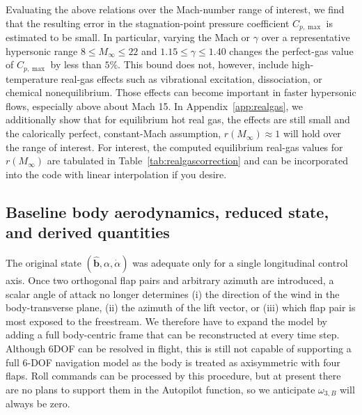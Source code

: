 Evaluating the above relations over the Mach-number range of interest, we find that the resulting error in the stagnation-point pressure coefficient \(C_{p,\max}\) is estimated to be small. In particular, varying the Mach or \(\gamma\) over a representative hypersonic range \(8 \le M_\infty \le 22\) and \(1.15 \le \gamma \le 1.40\) changes the perfect-gas value of \(C_{p,\max}\) by less than \(5\%\). This bound does not, however, include high-temperature real-gas effects such as vibrational excitation, dissociation, or chemical nonequilibrium. Those effects can become important in faster hypersonic flows, especially above about Mach 15. In Appendix~\ref{app:realgas}, we additionally show that for equilibrium hot real gas, the effects are still small and the calorically perfect, constant-Mach assumption, \(r(M_\infty)\approx1\) will hold over the range of interest. For interest, the computed equilibrium real-gas values for \(r(M_\infty)\) are tabulated in Table~\ref{tab:realgascorrection} and can be incorporated into the code with linear interpolation if you desire.

\subsection{Baseline body aerodynamics, reduced state, and derived quantities}\label{sec:baselineaero}

The original state \((\hat{\mathbf b},\alpha,\dot{\alpha})\) was adequate only for a single longitudinal control axis. Once two orthogonal flap pairs and arbitrary azimuth are introduced, a scalar angle of attack no longer determines (i) the direction of the wind in the body-transverse plane, (ii) the azimuth of the lift vector, or (iii) which flap pair is most exposed to the freestream. We therefore have to expand the model by adding a full body-centric frame that can be reconstructed at every time step. Although 6DOF can be resolved in flight, this is still not capable of supporting a full 6-DOF navigation model as the body is treated as axisymmetric with four flaps. Roll commands can be processed by this procedure, but at present there are no plans to support them in the Autopilot function, so we anticipate \(\omega_{3,B}\) will always be zero.

